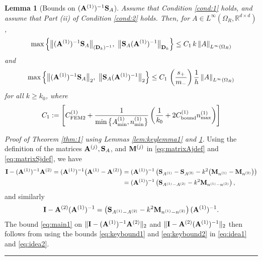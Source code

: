 \documentclass[10pt]{article}%
\newenvironment{proof}[1][Proof]{\noindent \emph{#1.} }
{\hfill \ \rule{0.5em}{0.5em}}
\newtheorem{lemma}[theorem]{Lemma}
\numberwithin{equation}{section}
\newcommand{\beq}{\begin{equation}}
\newcommand{\eeq}{\end{equation}}
\newcommand{\bpf}{\begin{proof}}
\newcommand{\epf}{\end{proof}}
\newcommand{\ble}{\begin{lemma}}
\newcommand{\ele}{\end{lemma}}
\newcommand{\Rea}{\mathbb{R}}
\newcommand{\OR}{{\Omega_R}}
\newcommand*{\N}[1]{\left\|#1\right\|}
\newcommand{\tand}{\text{ and }}
\newcommand{\matrixI}{{\bf I}}
\newcommand{\matrixD}{{\bf D}}
\newcommand{\matrixS}{{\bf S}}
\newcommand{\matrixM}{{\bf M}}
\newcommand{\matrixAj}{{\bf A}^{(j)}}
\newcommand{\matrixAo}{{\bf A}^{(1)}}
\newcommand{\matrixAt}{{\bf A}^{(2)}}
\newcommand{\matrixMj}{{\bf M}^{(j)}}
\newcommand{\coeffAo}{A^{(1)}}
\newcommand{\coeffno}{n^{(1)}}
\begin{document}
\ble[Bounds on $(\matrixAo)^{-1} \matrixS_A$]\label{lem:keylemma2}
Assume that Condition \ref{cond:1} holds, and assume that Part (ii) of Condition \ref{cond:2} holds. Then, for $A\in L^\infty(\OR,\Rea^{d\times d})$,
\beq\label{eq:keybound2}
\max\Big\{\big\| (\matrixAo)^{-1} \matrixS_A \big\|_{(\matrixD_k)^{-1}}, \,\,
\big\| \matrixS_A (\matrixAo)^{-1} \big\|_{\matrixD_k}\Big\} \leq C_1\, k\N{A}_{L^\infty(\OR)}
\eeq
and
\beq\label{eq:keybound2a}
\max\Big\{\big\| (\matrixAo)^{-1} \matrixS_A \big\|_2, \,\,
\big\| \matrixS_A (\matrixAo)^{-1} \big\|_2\Big\} \leq C_1\,\left(\frac{s_+}{m_-}\right) \frac{1}{h}\N{A}_{L^\infty(\OR)}
\eeq
for all $k\geq k_0$, where
\beq\label{eq:C1}
C_1:=%
\left[ C_{\rm FEM2}^{(1)} + 
 \frac{1}{\min\big\{\coeffAo_{\min},\coeffno_{\min}\big\}}\left( \frac{1}{k_0} + 2 C^{(1)}_{\rm bound}\coeffno_{\max}  \right) \right]
\eeq
\ele

\bpf[Proof of Theorem \ref{thm:1} using Lemmas \ref{lem:keylemma1} and \ref{lem:keylemma2}]
Using the definition of the matrices $\matrixAj, \matrixS_A$, and $\matrixMj$ in \eqref{eq:matrixAjdef} and \eqref{eq:matrixSjdef}, we have
\begin{align}\nonumber
\matrixI - (\matrixAo)^{-1}\matrixAt = (\matrixAo)^{-1}\big(\matrixAo-\matrixAt\big) &=  (\matrixAo)^{-1}\left( \matrixS_{A^{(1)}} - \matrixS_{A^{(2)}} - k^2 \big(\matrixM_{n^{(1)}}-\matrixM_{n^{(2)}}\big)\right)\\
&= (\matrixAo)^{-1}\left( \matrixS_{A^{(1)}-A^{(2)}} - k^2 \matrixM_{n^{(1)}-n^{(2)}}\right),\label{eq:idea1}
\end{align}
and similarly 
\beq\label{eq:idea2}
\matrixI -\matrixAt  (\matrixAo)^{-1}= \left( \matrixS_{A^{(1)}-A^{(2)}} - k^2 \matrixM_{n^{(1)}-n^{(2)}}\right)(\matrixAo)^{-1}.
\eeq
The bound  \eqref{eq:main1} on $\|\matrixI - (\matrixAo)^{-1}\matrixAt\|_2$ and  $\|\matrixI - \matrixAt(\matrixAo)^{-1}\|_2$ then follows from using the bounds \eqref{eq:keybound1} and \eqref{eq:keybound2} in \eqref{eq:idea1} and \eqref{eq:idea2}.
%
\epf
\end{document}
